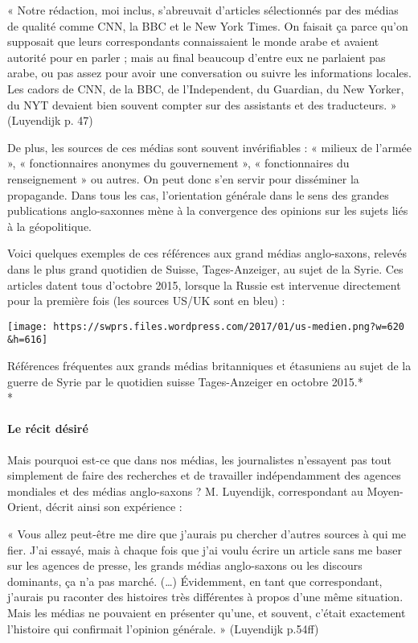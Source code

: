« Notre rédaction, moi inclus, s'abreuvait d'articles sélectionnés par
des médias de qualité comme CNN, la BBC et le New York Times. On faisait
ça parce qu'on supposait que leurs correspondants connaissaient le monde
arabe et avaient autorité pour en parler ; mais au final beaucoup
d'entre eux ne parlaient pas arabe, ou pas assez pour avoir une
conversation ou suivre les informations locales. Les cadors de CNN, de
la BBC, de l'Independent, du Guardian, du New Yorker, du NYT devaient
bien souvent compter sur des assistants et des traducteurs. » (Luyendijk
p. 47)

De plus, les sources de ces médias sont souvent invérifiables : «
milieux de l'armée », « fonctionnaires anonymes du gouvernement », «
fonctionnaires du renseignement » ou autres. On peut donc s'en servir
pour disséminer la propagande. Dans tous les cas, l'orientation générale
dans le sens des grandes publications anglo-saxonnes mène à la
convergence des opinions sur les sujets liés à la géopolitique.

Voici quelques exemples de ces références aux grand médias anglo-saxons,
relevés dans le plus grand quotidien de Suisse, Tages-Anzeiger, au sujet
de la Syrie. Ces articles datent tous d'octobre 2015, lorsque la Russie
est intervenue directement pour la première fois (les sources US/UK sont
en bleu) :

\texttt{[image: https://swprs.files.wordpress.com/2017/01/us-medien.png?w=620\\\&h=616]}

Références fréquentes aux grands médias britanniques et étasuniens au
sujet de la guerre de Syrie par le quotidien suisse Tages-Anzeiger en
octobre 2015.*\\
*

\hypertarget{le-ruxe9cit-duxe9siruxe9}{%
\paragraph{Le récit désiré}\label{le-ruxe9cit-duxe9siruxe9}}

Mais pourquoi est-ce que dans nos médias, les journalistes n'essayent
pas tout simplement de faire des recherches et de travailler
indépendamment des agences mondiales et des médias anglo-saxons ? M.
Luyendijk, correspondant au Moyen-Orient, décrit ainsi son expérience :

« Vous allez peut-être me dire que j'aurais pu chercher d'autres sources
à qui me fier. J'ai essayé, mais à chaque fois que j'ai voulu écrire un
article sans me baser sur les agences de presse, les grands médias
anglo-saxons ou les discours dominants, ça n'a pas marché. (\ldots{})
Évidemment, en tant que correspondant, j'aurais pu raconter des
histoires très différentes à propos d'une même situation. Mais les
médias ne pouvaient en présenter qu'une, et souvent, c'était exactement
l'histoire qui confirmait l'opinion générale. » (Luyendijk p.54ff)

